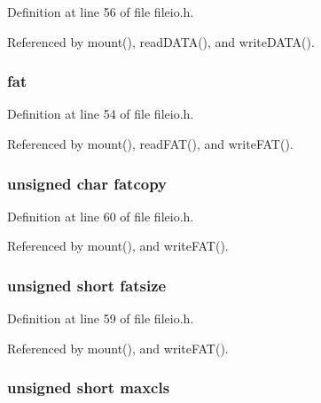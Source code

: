 Definition at line 56 of file fileio.\-h.



Referenced by mount(), read\-D\-A\-T\-A(), and write\-D\-A\-T\-A().

\hypertarget{struct_m_e_d_i_a_a8703e77c9af68598f5ba9fc70528c78e}{
\subsubsection[{fat}]{ fat}}\label{struct_m_e_d_i_a_a8703e77c9af68598f5ba9fc70528c78e}


Definition at line 54 of file fileio.\-h.



Referenced by mount(), read\-F\-A\-T(), and write\-F\-A\-T().

\hypertarget{struct_m_e_d_i_a_af0c81f9f766295c07fd33e1040d38318}{
\subsubsection[{fatcopy}]{\setlength{\rightskip}{0pt plus 5cm}unsigned char fatcopy}}\label{struct_m_e_d_i_a_af0c81f9f766295c07fd33e1040d38318}


Definition at line 60 of file fileio.\-h.



Referenced by mount(), and write\-F\-A\-T().

\hypertarget{struct_m_e_d_i_a_a74af0e18d550fb61c6433afa4afcddae}{
\subsubsection[{fatsize}]{\setlength{\rightskip}{0pt plus 5cm}unsigned short fatsize}}\label{struct_m_e_d_i_a_a74af0e18d550fb61c6433afa4afcddae}


Definition at line 59 of file fileio.\-h.



Referenced by mount(), and write\-F\-A\-T().

\hypertarget{struct_m_e_d_i_a_a188ac56cd2b9e488f7f16fec93bb02ab}{
\subsubsection[{maxcls}]{\setlength{\rightskip}{0pt plus 5cm}unsigned short maxcls}}\label{struct_m_e_d_i_a_a188ac56cd2b9e488f7f16fec93bb02ab}


